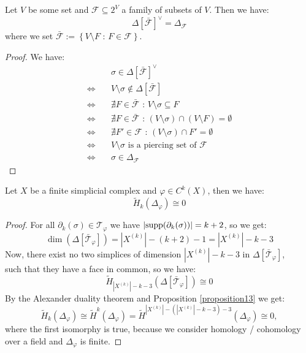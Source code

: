 \begin{prop}\label{proposition13}
Let \(V\) be some set and \(\mathcal{F}\subseteq 2^V\) a family of subsets of \(V\). Then we have:
\[
\Delta\left[\bar{\mathcal{F}}\right]^{\lor}=\Delta_{\mathcal{F}}
\]
where we set \(\bar{\mathcal{F}}:=\left\{V\setminus F\text{ : }F\in\mathcal{F}\right\}\).
\begin{proof}


We have:
\begin{align*}
  & \sigma\in\Delta\left[\bar{\mathcal{F}}\right]^{\lor} \\
  \Longleftrightarrow \quad & V\setminus\sigma\notin\Delta\left[\bar{\mathcal{F}}\right] \\
  \Longleftrightarrow \quad & \nexists F\in\bar{\mathcal{F}}\text{ : }V\setminus\sigma\subseteq F \\
  \Longleftrightarrow \quad & \nexists F\in\bar{\mathcal{F}}\text{ : }(V\setminus\sigma)\cap(V\setminus F)=\emptyset \\
  \Longleftrightarrow \quad & \nexists F'\in\mathcal{F}\text{ : }(V\setminus\sigma)\cap F'=\emptyset \\
  \Longleftrightarrow \quad & V\setminus\sigma\text{ is a piercing set of }\mathcal{F} \\
  \Longleftrightarrow \quad & \sigma\in\Delta_{\mathcal{F}}
 \end{align*}
\end{proof}
\end{prop}

\begin{thm}
Let \(X\) be a finite simplicial complex and \(\varphi\in C^k(X)\), then we have:
\[
\tilde{H}_k(\Delta_{\varphi})\cong 0
\]
\begin{proof}
For all \(\partial_k(\sigma)\in\mathcal{T}_{\varphi}\) we have \(|\mathrm{supp}(\partial_k(\sigma))|=k+2\), so we get:
\[
\dim(\Delta[\bar{\mathcal{T}}_{\varphi}])=|X^{(k)}|-(k+2)-1=|X^{(k)}|-k-3
\]
Now, there exist no two simplices of dimension \(|X^{(k)}|-k-3\) in \(\Delta[\bar{\mathcal{T}}_{\varphi}]\),\\
such that they have a face in common, so we have:
\[
\tilde{H}_{|X^{(k)}|-k-3}(\Delta[\bar{\mathcal{T}}_{\varphi}])\cong 0
\]
By the Alexander duality theorem and Proposition \ref{proposition13} we get:
\[
\tilde{H}_k(\Delta_{\varphi})\cong\tilde{H}^k(\Delta_{\varphi})=\tilde{H}^{|X^{(k)}|-(|X^{(k)}|-k-3)-3}(\Delta_{\varphi})\cong 0,
\]
where the first isomorphy is true, because we consider homology / cohomology over a field and \(\Delta_{\varphi}\) is finite.
\end{proof}
\end{thm}

